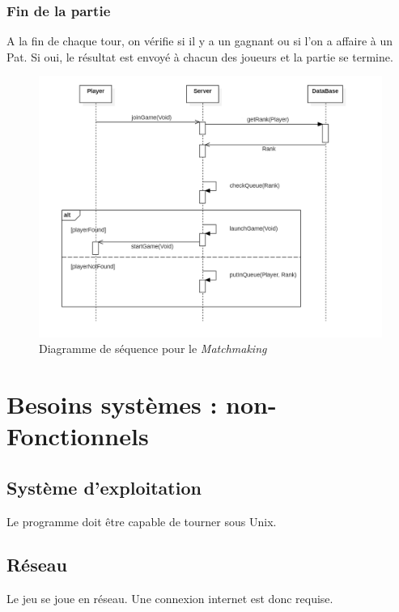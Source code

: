 \documentclass[10pt, a4paper]{article}
\begin{document}
\subsubsection{Fin de la partie}
A la fin de chaque tour, on vérifie si il y a un gagnant ou si l'on a affaire à un Pat. Si oui, le résultat est envoyé à chacun des joueurs et la partie se termine.

		
\label{matchmaker}
		
\begin{figure}[ht]
\centering
\includegraphics[scale=0.4]{SequenceDiagramMatchmaking.PNG}
\caption{Diagramme de séquence pour le \textit{Matchmaking}}
\label{SD_matchmaker} %
\end{figure}

\section{Besoins systèmes : non-Fonctionnels}

\subsection{Système d'exploitation}
Le programme doit être capable de tourner sous Unix. \\

\subsection{Réseau}
Le jeu se joue en réseau. Une connexion internet est donc requise. \\
\end{document}
